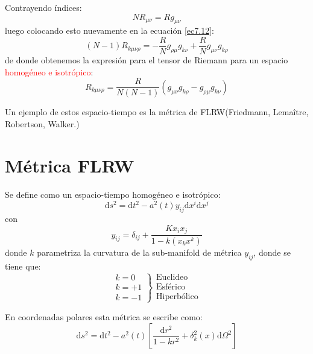 \documentclass[../main]{subfiles}
\begin{document}
Contrayendo índices:
\begin{equation}
    NR_{\mu\nu}=Rg_{\mu\nu}
\end{equation}
luego colocando esto nuevamente en la ecuación \eqref{ec7.12}:
\begin{equation}
    (N-1)R_{k\mu\nu\rho}=-\dfrac{R}{N}g_{\rho\mu}g_{k\nu}+\dfrac{R}{N}g_{\mu\nu}g_{k\rho}
\end{equation}
de donde obtenemos la expresión para el tensor de Riemann para un espacio \textcolor{red}{homogéneo e isotrópico}:
\begin{equation}
    R_{k\mu\nu\rho}=\dfrac{R}{N(N-1)}(g_{\mu\nu}g_{k\rho}-g_{\rho\mu}g_{k\nu})
\end{equation}

Un ejemplo de estos espacio-tiempo es la métrica de FLRW(Friedmann, Lemaître, Robertson, Walker.)

\section{Métrica FLRW}

Se define como un espacio-tiempo homogéneo e isotrópico:
\begin{equation}
    \mathrm{d}s^2=\mathrm{d}t^2-a^2(t)y_{ij}\mathrm{d}x^{i}\mathrm{d}x^j
\end{equation}
con 
\begin{equation}
    y_{ij}=\delta_{ij}+\dfrac{K x_i x_j}{1-k(x_k x^k)}
\end{equation}
donde $k$ parametriza la curvatura de la sub-manifold de métrica $y_{ij}$, donde se tiene que:
\begin{equation}
    \left.
    \begin{array}{c}
        k=0\\
        k=+1\\
        k=-1
    \end{array}
    \right\}
    \begin{array}{c}
        \text{Euclideo}\\
        \text{Esférico}\\
        \text{Hiperbólico}
    \end{array}
\end{equation}

En coordenadas polares esta métrica se escribe como:
\begin{equation}
    \mathrm{d}s^2=\mathrm{d}t^2-a^2(t)\left[\dfrac{\mathrm{d}r^2}{1-kr^2}+\delta^2_k(x)\mathrm{d}\Omega^2\right]
\end{equation}
\end{document}
